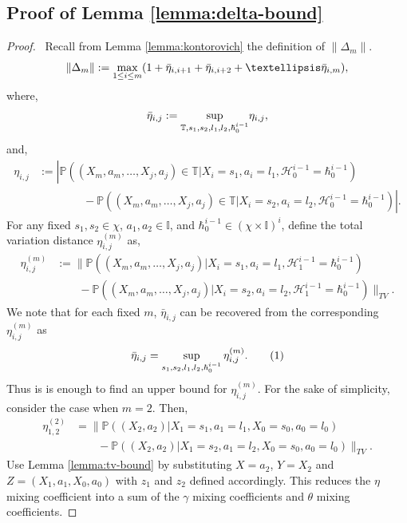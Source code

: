 \documentclass[opre,sglanonrev]{informs4}
\numberwithin{equation}{section}
\newcommand{\pow}[1]{^{(#1)}}
\newcommand{\lp}{\left(}
\newcommand{\rp}{\right)}
\newcommand{\History}{\mathcal{H}}
\newcommand{\history}{\hbar}
\newcommand{\Ibb}{\mathbb{I}}
\newcommand{\Pbb}{\mathbb{P}}
\newcommand{\deltam}{\lVert \Delta_m \rVert}
\newcommand\numberthis{\addtocounter{equation}{1}\tag{\theequation}}
\newcommand{\prob}{\Pbb}
\newcommand{\probl}{\prob}
\begin{document}
\begin{APPENDICES}
\subsection{Proof of Lemma \ref{lemma:delta-bound}}
\begin{proof} \
Recall from Lemma \ref{lemma:kontorovich} the definition of $\deltam$.
\[
\|\Delta_m\|:=\underset{1\leq i\leq m}{\max} (1+ \Bar{\eta}_{i,i+1}+ \Bar{\eta}_{i,i+2}+\dots \Bar{\eta}_{i,m}),
\]
where, 
\begin{align*}
    \Bar{\eta}_{i,j}:= \underset{\mathbb{T},s_1,s_2,l_1,l_2,\history_0^{i-1}}{\sup} \eta_{i,j},
\end{align*}
and, 
\begin{align*}
    \eta_{i,j} & := \left|\prob\left((X_m,a_m,\dots, X_j,a_j)\in \mathbb{T}|X_i=s_1,a_i=l_1,\History_0^{i-1}=\history_0^{i-1}\right)\right.\\
    & \left.\qquad \qquad -\prob\left((X_m,a_m,\dots,X_j,a_j)\in\mathbb{T}|X_i=s_2,a_i=l_2,\History_0^{i-1}=\history_0^{i-1}\right)\right|.
\end{align*}
For any fixed $s_1,s_2\in \chi$, $a_1,a_2\in\Ibb$, and $\history_0^{i-1}\in (\chi\times\Ibb)^{i}$, define the total variation distance $\eta_{i,j}\pow{m}$ as, 
\begin{align*}
\eta_{i,j}\pow{m} & := \|\probl\left((X_m,a_m,\dots, X_j,a_j)|X_i=s_1,a_i=l_1,\History_1^{i-1}=\history_0^{i-1}\right)\\
    &  \qquad -\probl\left((X_m,a_m,\dots,X_j,a_j)|X_i=s_2,a_i=l_2,\History_1^{i-1}=\history_0^{i-1}\right)\|_{TV}.
\end{align*}
We note that for each fixed $m$, $\bar \eta_{i,j}$ can be recovered from the corresponding $\eta_{i,j}\pow{m}$ as 
\begin{align*}
    \bar \eta_{i,j} = \sup_{s_1,s_2,l_1,l_2,\history_0^{i-1}} \eta_{i,j}\pow{m}. \numberthis\label{eq:db-eq4}
\end{align*}
Thus is is enough to find an upper bound for $\eta_{i,j}\pow{m}$. 
For the sake of simplicity, consider the case when $m=2$. Then, 
\begin{align*}
    \eta_{1,2}\pow{2} & =\bigg\|\probl\lp(X_2,a_2)|X_1=s_1,a_1=l_1,X_0=s_0,a_0=l_0\rp\\
    & \qquad -\probl\lp(X_2,a_2)|X_1=s_2,a_1=l_2,X_0=s_0,a_0=l_0\rp\bigg\|_{TV}.
\end{align*}
Use Lemma \ref{lemma:tv-bound} by substituting $X=a_2$, $Y=X_2$ and $Z=(X_1,a_1,X_0,a_0)$ with $z_1$ and $z_2$ defined accordingly.
This reduces the $\eta$ mixing coefficient into a sum of the $\gamma$ mixing coefficients and $\theta$ mixing coefficients. 

\end{proof}
\end{APPENDICES}
\end{document}
